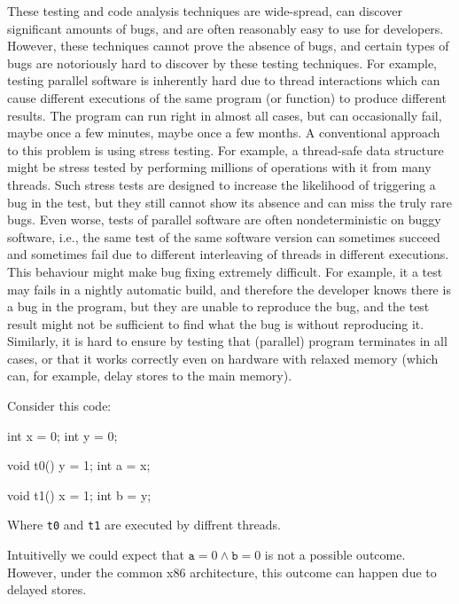 These testing and code analysis techniques are wide-spread, can discover significant amounts of bugs, and are often reasonably easy to use for developers.
However, these techniques cannot prove the absence of bugs, and certain types of bugs are notoriously hard to discover by these testing techniques.
For example, testing parallel software is inherently hard due to thread interactions which can cause different executions of the same program (or function) to produce different results.
The program can run right in almost all cases, but can occasionally fail, maybe once a few minutes, maybe once a few months.
A conventional approach to this problem is using stress testing.
For example, a thread-safe data structure might be stress tested by performing millions of operations with it from many threads.
Such stress tests are designed to increase the likelihood of triggering a bug in the test, but they still cannot show its absence and can miss the truly rare bugs.
Even worse, tests of parallel software are often nondeterministic on buggy software, i.e., the same test of the same software version can sometimes succeed and sometimes fail due to different interleaving of threads in different executions.
This behaviour might make bug fixing extremely difficult.
For example, it a test may fails in a nightly automatic build, and therefore the developer knows there is a bug in the program, but they are unable to reproduce the bug, and the test result might not be sufficient to find what the bug is without reproducing it.
Similarly, it is hard to ensure by testing that (parallel) program terminates in all cases, or that it works correctly even on hardware with relaxed memory (which can, for example, delay stores to the main memory).\begin{marginnote}%
Consider this code:

\begin{cppcode}
int x = 0;
int y = 0;

void t0() {
  y = 1;
  int a = x;
}

void t1() {
  x = 1;
  int b = y;
}
\end{cppcode}

Where \texttt{t0} and \texttt{t1} are executed by diffrent threads.

Intuitivelly we could expect that $\texttt{a} = 0 \land \texttt{b} = 0$ is not a possible outcome.
However, under the common x86 architecture, this outcome can happen due to delayed stores.
\end{marginnote}

